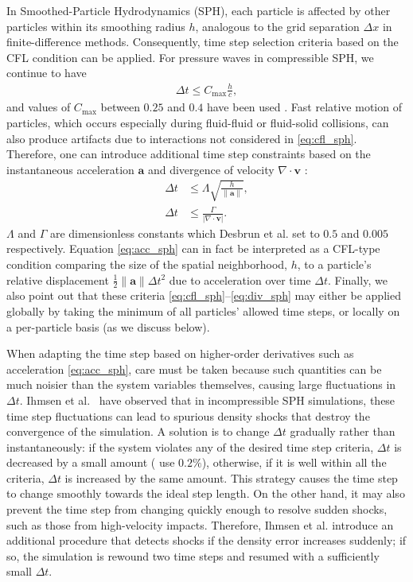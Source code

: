 In Smoothed-Particle Hydrodynamics (SPH), each particle is affected by other particles within its smoothing radius $h$, analogous to the grid separation $\Delta x$ in finite-difference methods.
Consequently, time step selection criteria based on the CFL condition can be applied.
For pressure waves in compressible SPH, we continue to have
\begin{align}
  \label{eq:cfl_sph}
  \Delta t \le C_{\max}\frac hc,
\end{align}
and values of $C_{\max}$ between $0.25$ and $0.4$ have been used \cite{Monaghan1992,Desbrun1999}.
Fast relative motion of particles, which occurs especially during fluid-fluid or fluid-solid collisions, can also produce artifacts due to interactions not considered in \eqref{eq:cfl_sph}.
Therefore, one can introduce additional time step constraints based on the instantaneous acceleration $\mathbf a$ and divergence of velocity $\nabla \cdot \mathbf v$ \cite{Monaghan1992,Desbrun1999}:
\begin{align}
    \label{eq:acc_sph}
    \Delta t &\leq \Lambda \sqrt{\frac{h}{\|\mathbf a\|}}, \\
    \label{eq:div_sph}
    \Delta t &\leq \frac{\Gamma}{|\nabla \cdot \mathbf v|}.
\end{align}
$\Lambda$ and $\Gamma$ are dimensionless constants which Desbrun et al. \cite{Desbrun1999} set to $0.5$ and $0.005$ respectively.
Equation \eqref{eq:acc_sph} can in fact be interpreted as a CFL-type condition comparing the size of the spatial neighborhood, $h$, to a particle's relative displacement $\frac12\|\mathbf a\|\Delta t^2$ due to acceleration over time $\Delta t$.
Finally, we also point out that these criteria \eqref{eq:cfl_sph}--\eqref{eq:div_sph} may either be applied globally by taking the minimum of all particles' allowed time steps, or locally on a per-particle basis (as we discuss below).

When adapting the time step based on higher-order derivatives such as acceleration \eqref{eq:acc_sph}, care must be taken because such quantities can be much noisier than the system variables themselves, causing large fluctuations in $\Delta t$.
Ihmsen et al.~\cite{Ihmsen2010} have observed that in incompressible SPH simulations, these time step fluctuations can lead to spurious density shocks that destroy the convergence of the simulation.
A solution is to change $\Delta t$ gradually rather than instantaneously: if the system violates any of the desired time step criteria, $\Delta t$ is decreased by a small amount (\cite{Ihmsen2010} use $0.2\%$), otherwise, if it is well within all the criteria, $\Delta t$ is increased by the same amount.
This strategy causes the time step to change smoothly towards the ideal step length.
On the other hand, it may also prevent the time step from changing quickly enough to resolve sudden shocks, such as those from high-velocity impacts.
Therefore, Ihmsen et al. introduce an additional procedure that detects shocks if the density error increases suddenly; if so, the simulation is rewound two time steps and resumed with a sufficiently small $\Delta t$.
